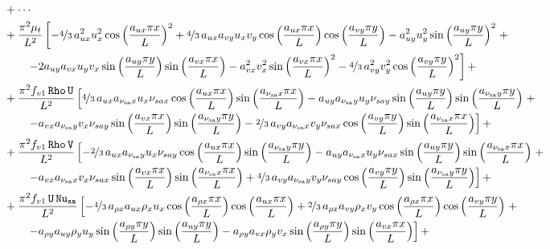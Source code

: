 \documentclass[10pt]{article}
\newcommand{\Rho}{\,\mathtt{Rho}}
\newcommand{\U}{\,\mathtt{U}}
\newcommand{\V}{\,\mathtt{V}}
\newcommand{\Nu}{\,\mathtt{Nu_{sa}}}
\newcommand{\sa}{\nu_{\mathrm{sa}}}
\begin{document}
\begin{equation}\label{eq:ns_2d_e}
\begin{split}
&+\cdots\\
&+\dfrac{\pi^2 \mu_t}{L^2}\left[-\nicefrac{4}{3}\, a_{ux}^2 u_x^2 \cos\left(\dfrac{a_{ux} \pi x}{L}\right)^2+\nicefrac{4}{3}\, a_{ux} a_{vy} u_x v_y \cos\left(\dfrac{a_{ux} \pi x}{L}\right) \cos\left(\dfrac{a_{vy} \pi y}{L}\right)-a_{uy}^2 u_y^2 \sin\left(\dfrac{a_{uy} \pi y}{L}\right)^2\right.+\\
   &\qquad\left.-2 a_{uy} a_{vx} u_y v_x \sin\left(\dfrac{a_{uy} \pi y}{L}\right) \sin\left(\dfrac{a_{vx} \pi x}{L}\right)-a_{vx}^2 v_x^2 \sin\left(\dfrac{a_{vx} \pi x}{L}\right)^2-\nicefrac{4}{3}\, a_{vy}^2 v_y^2 \cos\left(\dfrac{a_{vy} \pi y}{L}\right)^2\right] +\\
&+\dfrac{\pi^2 f_{v1} \Rho \U}{L^2}\left[\nicefrac{4}{3}\, a_{ux} a_{\sa x} u_x \nu_{sa x} \cos\left(\dfrac{a_{ux} \pi x}{L}\right) \sin\left(\dfrac{a_{\sa x} \pi x}{L}\right)-a_{uy} a_{\sa y} u_y \nu_{sa y} \sin\left(\dfrac{a_{uy} \pi y}{L}\right) \sin\left(\dfrac{a_{\sa y} \pi y}{L}\right)\right.+\\
     &\qquad\left.-a_{vx} a_{\sa y} v_x \nu_{sa y} \sin\left(\dfrac{a_{vx} \pi x}{L}\right) \sin\left(\dfrac{a_{\sa y} \pi y}{L}\right)-\nicefrac{2}{3}\, a_{vy} a_{\sa x} v_y \nu_{sa x} \cos\left(\dfrac{a_{vy} \pi y}{L}\right) \sin\left(\dfrac{a_{\sa x} \pi x}{L}\right)\right] +\\
&+\dfrac{ \pi^2 f_{v1} \Rho \V}{L^2}\left[-\nicefrac{2}{3}\, a_{ux} a_{\sa y} u_x \nu_{sa y} \cos\left(\dfrac{a_{ux} \pi x}{L}\right) \sin\left(\dfrac{a_{\sa y} \pi y}{L}\right)-a_{uy} a_{\sa x} u_y \nu_{sa x} \sin\left(\dfrac{a_{uy} \pi y}{L}\right) \sin\left(\dfrac{a_{\sa x} \pi x}{L}\right)\right.+\\
    &\qquad\left.-a_{vx} a_{\sa x} v_x \nu_{sa x} \sin\left(\dfrac{a_{vx} \pi x}{L}\right) \sin\left(\dfrac{a_{\sa x} \pi x}{L}\right)+\nicefrac{4}{3}\, a_{vy} a_{\sa y} v_y \nu_{sa y} \cos\left(\dfrac{a_{vy} \pi y}{L}\right) \sin\left(\dfrac{a_{\sa y} \pi y}{L}\right)\right]+\\
&+\dfrac{\pi^2 f_{v1} \U \Nu}{L^2}\left[-\nicefrac{4}{3}\, a_{\rho x} a_{ux} \rho_x u_x \cos\left(\dfrac{a_{\rho x} \pi x}{L}\right) \cos\left(\dfrac{a_{ux} \pi x}{L}\right)+\nicefrac{2}{3}\, a_{\rho x} a_{vy} \rho_x v_y \cos\left(\dfrac{a_{\rho x} \pi x}{L}\right) \cos\left(\dfrac{a_{vy} \pi y}{L}\right)\right.+\\
    &\qquad\left.-a_{\rho y} a_{uy} \rho_y u_y \sin\left(\dfrac{a_{\rho y} \pi y}{L}\right) \sin\left(\dfrac{a_{uy} \pi y}{L}\right)-a_{\rho y} a_{vx} \rho_y v_x \sin\left(\dfrac{a_{\rho y} \pi y}{L}\right) \sin\left(\dfrac{a_{vx} \pi x}{L}\right)\right] +\\

\end{split}
\end{equation}
\end{document}

